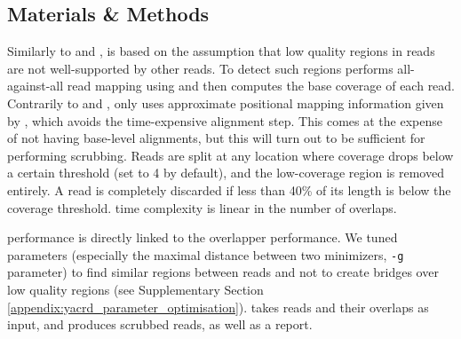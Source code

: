 \documentclass[./main.tex]{subfiles}
\begin{document}

\subsection{Materials \& Methods}

Similarly to \dascrubber and \miniscrub, \textbf{\yacrd} is based on the assumption that low quality regions in reads are not well-supported by other reads. To detect such regions \yacrd performs all-against-all read mapping using \minimap and then computes the base coverage of each read. Contrarily to \dascrubber and \miniscrub, \yacrd  only uses approximate positional mapping information given by \minimap, which avoids the time-expensive alignment step. This comes at the expense of not having base-level alignments, but this will turn out to be sufficient for performing scrubbing. Reads are split at any location where coverage drops below a certain threshold (set to 4 by default), and the low-coverage region is removed entirely. A read is completely discarded if less than 40\% of its length is below the coverage threshold. \yacrd time complexity is linear in the number of overlaps.

\yacrd performance is directly linked to the overlapper performance. We tuned \minimap parameters (especially the maximal distance between two minimizers, \texttt{-g} parameter) to find similar regions between reads and not to create bridges over low quality regions (see Supplementary Section \ref{appendix:yacrd_parameter_optimisation}).
\yacrd takes reads and their overlaps as input, and produces scrubbed reads, as well as a report. %
\end{document}
